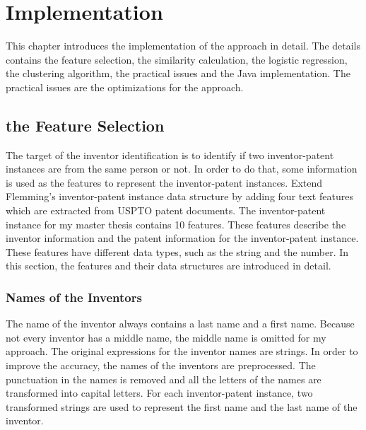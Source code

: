 \chapter{Implementation}
\label{cha:impl}
This chapter introduces the implementation of the approach in detail. The details contains the feature selection, the similarity calculation, the logistic regression, the clustering algorithm, the practical issues and the Java implementation. The practical issues are the optimizations for the approach.
 
\section{the Feature Selection}
The target of the inventor identification is to identify if two inventor-patent instances are from the same person or not. In order to do that, some information is used as the features to represent the inventor-patent instances. Extend Flemming's \cite{RePEc:eee:respol:v:43:y:2014:i:6:p:941-955} inventor-patent instance data structure by adding four text features which are extracted from USPTO patent documents. The inventor-patent instance for my master thesis contains 10 features. These features describe the inventor information and the patent information for the inventor-patent instance. These features have different data types, such as the string and the number. In this section, the features and their data structures are introduced in detail.


\subsection{Names of the Inventors}
The name of the inventor always contains a last name and a first name. Because not every inventor has a middle name, the middle name is omitted for my approach. The original expressions for the inventor names are strings. In order to improve the accuracy, the names of the inventors are preprocessed. The punctuation in the names is removed and all the letters of the names are transformed into capital letters. For each inventor-patent instance, two transformed strings are used to represent the first name and the last name of the inventor. 

